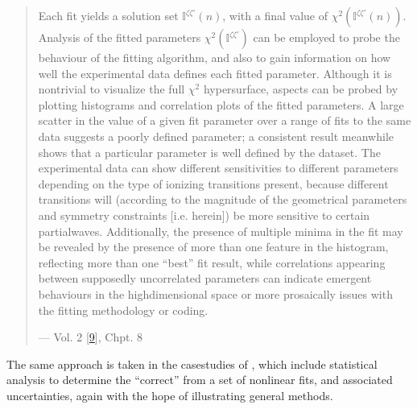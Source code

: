 \documentclass[letterpaper,table,10pt,english]{jupyterBook}
\begin{document}
\begin{quote}

\sphinxAtStartPar
Each fit yields a solution set \(\mathbb{I}^{\zeta\zeta'}(n)\), with a final value of \(\chi^{2}(\mathbb{I}^{\zeta\zeta'}(n))\). Analysis of the fitted parameters \(\chi^{2}(\mathbb{I}^{\zeta\zeta'})\) can be employed to probe the behaviour of the fitting algorithm, and also to gain information on how well the experimental data defines each fitted parameter. Although it is non\sphinxhyphen{}trivial to visualize the full \(\chi^{2}\) hypersurface, aspects can be probed by plotting histograms and correlation plots of the fitted parameters. A large scatter in the value of a given fit parameter over a range of fits to the same data suggests a poorly defined parameter; a consistent result meanwhile shows that a particular parameter is well defined by the dataset. The experimental data can show different sensitivities to different parameters depending on the type of ionizing transitions present, because different transitions will (according to the magnitude of the geometrical parameters and symmetry constraints {[}i.e. {\hyperref[\detokenize{backmatter/glossary:term-channel-functions}]{}} herein{]}) be more sensitive to certain partial\sphinxhyphen{}waves. Additionally, the presence of multiple minima in the fit may be revealed by the presence of more than one feature in the histogram, reflecting more than one “best” fit result, while correlations appearing between supposedly uncorrelated parameters can indicate emergent behaviours in the high\sphinxhyphen{}dimensional space or \sphinxhyphen{} more prosaically \sphinxhyphen{} issues with the fitting methodology or coding.

\begin{flushright}
--- Vol. 2 {[}\hyperlink{cite.backmatter/bibliography:id678}{9}{]}, Chpt. 8
\end{flushright}
\end{quote}

\sphinxAtStartPar
The same approach is taken in the case\sphinxhyphen{}studies of {\hyperref[\detokenize{part2/extracting_matrix_elements_overview_270423:chpt-extracting-matrix-elements-overview}]{}}, which include statistical analysis to determine the “correct” {\hyperref[\detokenize{backmatter/glossary:term-radial-matrix-elements}]{}} from a set of non\sphinxhyphen{}linear fits, and associated uncertainties, again with the hope of illustrating general methods.
\end{document}
